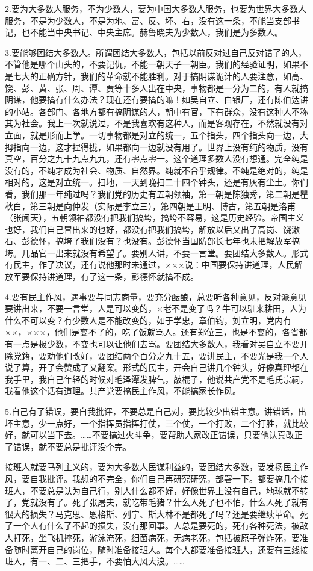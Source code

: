 2.要为大多数人服务，不为少数人，要为中国大多数人服务，也要为世界大多数人服务，不是为少数人，不是为地、富、反、坏、右，没有这一条，不能当支部书记，也不能当中央书记、中央主席。赫鲁晓夫为少数人，我们是为多数人。

3.要能够团结大多数人。所谓团结大多数人，包括以前反对过自己反对错了的人，不管他是哪个山头的，不要记仇，不能一朝天子一朝臣。我们的经验证明，如果不是七大的正确方针，我们的革命就不能胜利。对于搞阴谋诡计的人要注意，如高、饶、彭、黄、张、周、谭、贾等十多人出在中央，事物都是一分为二的，有人就搞阴谋，他要搞有什么办法？现在还有要搞的嘛！如吴自立、白银厂，还有陈伯达讲的小站。各部门、各地方都有搞阴谋的人，朝中有官，下有群众，没有这种人不称其为社会。我上一次就说过，不是我喜欢有这种人，而是客观存在，不然就没有对立面，就是形而上学。一切事物都是对立的统一，五个指头，四个指头向一边，大拇指向一边，这才捏得拢，如果都向一边就没有用了。世界上没有纯的物质，没有真空，百分之九十九点九九，还有零点零一。这个道理多数人没有想通。完全纯是没有的，不纯才成为社会、物质、自然界。纯就不合乎规律。不纯是绝对的，纯是相对的，这是对立统一。扫地，一天到晚扫二十四个钟头，还是有灰有尘土。你们看，我们那一年纯过吗？我们党的历史有五朝领袖，第一朝是陈独秀，第二朝是瞿秋白，第三朝是向仲发（实际是李立三），第四朝是王明、博古，第五朝是洛甫（张闻天），五朝领袖都没有把我们搞垮，搞垮不容易，这是历史经验。帝国主义也好，我们自己冒出来的也好，都没有把我们搞垮，解放以后又出了高岗、饶漱石、彭德怀，搞垮了我们没有？也没有。彭德怀当国防部长七年也未把解放军搞垮。几品官一出来就没有希望了。要别人讲，不要一言堂。要团结大多数人。形式有民主，作了决议，还有说他那时未通过，×××说：中国要保持讲道理，人民解放军要保持讲道理，有了这一条，彭德怀就搞不成。

4.要有民主作风，遇事要与同志商量，要充分酝酿，总要听各种意见，反对派意见要讲出来，不要一言堂，人是可以变的，×老不是变了吗？牛可以驯来耕田，人为什么不可以变？有少数人是不能改变的，如于学忠，章伯钧，刘立明，党内有××，×××，他们是变不了的，吃了饭就骂人。还有郑位三，也是不变的，各省都有一点是极少数，不变也可以让他们去骂。要团结大多数人，我看对吴自立不要开除党籍，要劝他们改好，要团结两个百分之九十五，要讲民主，不要光是我一个人说了算，开了会赞成了又翻案。形式的民主，开会自己讲几个钟头，好像真理都在我手里，我自己年轻的时候对毛泽潭发脾气，敲棍子，他说共产党不是毛氏宗祠，我看他这个话有道理。共产党要搞民主作风，不能搞家长作风。

5.自己有了错误，要自我批评，不要总是自己对，要比较少出错主意。讲错话，出坏主意，少一点好，一个指挥员指挥打仗，三个仗，一个打败，二个打胜，就比较好，就可以当下去。……不要搞过火斗争，要帮助人家改正错误，只要他认真改正了错误，就不要总是批评没个完。

接班人就要马列主义的，要为大多数人民谋利益的，要团结大多数，要发扬民主作风，要自我批评。我想的不完全，你们自己再研究研究，部署一下。都要搞几个接班人，不要总是认为自己行，别人什么都不好，好像世界上没有自己，地球就不转了，党就没有了。死了张屠夫，就吃带毛猪？什么人死了也不怕，什么人死了就有很大的损失？马克思、恩格斯、列宁、斯大林不是都死了吗？还是要继续革命。死了一个人有什么了不起的损失，没有那回事。人总是要死的，死有各种死法，被敌人打死，坐飞机摔死，游泳淹死，细菌病死，无病老死，包括被原子弹炸死，要准备随时离开自己的岗位，随时准备接班人。每个人都要准备接班人，还要有三线接班人，有一、二、三把手，不要怕大风大浪。……

